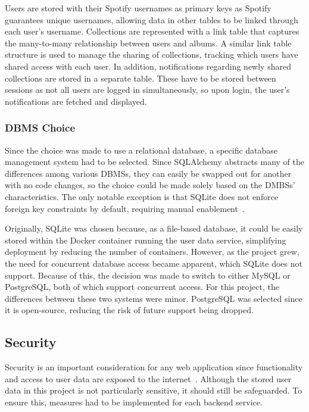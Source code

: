 Users are stored with their Spotify usernames as primary keys as Spotify guarantees unique usernames, allowing data in other tables to be linked through each user's username. Collections are represented with a link table that captures the many-to-many relationship between users and albums. A similar link table structure is used to manage the sharing of collections, tracking which users have shared access with each user. In addition, notifications regarding newly shared collections are stored in a separate table. These have to be stored between sessions as not all users are logged in simultaneously, so upon login, the user's notifications are fetched and displayed.

\subsubsection{DBMS Choice}
Since the choice was made to use a relational database, a specific database management system had to be selected. Since SQLAlchemy abstracts many of the differences among various DBMSs, they can easily be swapped out for another with no code changes, so the choice could be made solely based on the DMBSs' characteristics. The only notable exception is that SQLite does not enforce foreign key constraints by default, requiring manual enablement~\cite{SQLiteForeignKeys}.

Originally, SQLite was chosen because, as a file-based database, it could be easily stored within the Docker container running the user data service, simplifying deployment by reducing the number of containers. However, as the project grew, the need for concurrent database access became apparent, which SQLite does not support. Because of this, the decision was made to switch to either MySQL or PostgreSQL, both of which support concurrent access. For this project, the differences between these two systems were minor. PostgreSQL was selected since it is open-source, reducing the risk of future support being dropped.

\subsection{Security}
Security is an important consideration for any web application since functionality and access to user data are exposed to the internet~\cite{7980348}. Although the stored user data in this project is not particularly sensitive, it should still be safeguarded. To ensure this, measures had to be implemented for each backend service.

